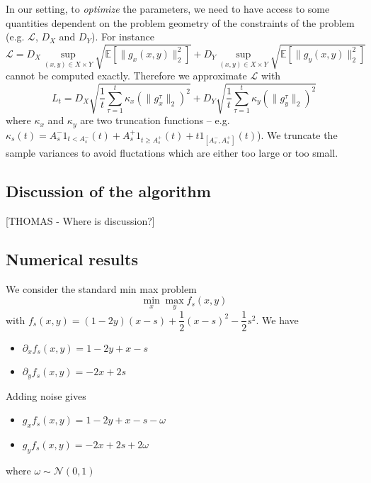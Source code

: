 \documentclass[12pt,reqno]{amsart}
\numberwithin{equation}{section}
\begin{document}
In our setting, to \emph{optimize} the parameters, we need to have access to some quantities dependent on the problem geometry of the constraints of the problem (e.g. $\mathcal{L}$, $D_{X}$ and $D_{Y}$). For instance
$$
\mathcal{L} = D_{X} \sup_{(x,y) \in X \times Y} \sqrt{\mathbb{E}[\lVert g_{x}(x,y) \rVert_{2}^{2}]} + 
D_{Y} \sup_{(x,y) \in X \times Y} \sqrt{\mathbb{E}[\lVert g_{y}(x,y) \rVert_{2}^{2}]}
$$
cannot be computed exactly. Therefore we approximate $\mathcal{L}$ with  
$$
L_{t} = D_{X}\sqrt{\dfrac{1}{t}\sum_{\tau=1}^{t}\kappa_{x}(\lVert g_{x}^{\tau} \rVert_{2})^{2}} + D_{Y}\sqrt{\dfrac{1}{t}\sum_{\tau=1}^{t}  \kappa_{y}(\lVert g_{y}^{\tau} \rVert_{2})^{2}}
$$
where $\kappa_{x}$ and $\kappa_{y}$ are two truncation functions -- e.g. $\kappa_{s}(t) = A_{s}^{-}1_{ t < A_{s}^{-}}(t) + A_{s}^{+}1_{ t \geq A_{s}^{+}}(t) + t 1_{ [A_{s}^{-}, A_{s}^{+}]}(t)$). We truncate the sample variances to avoid fluctations which are either too large or too small.
%
%

\subsection{Discussion of the algorithm}

[THOMAS - Where is discussion?]

\subsection{Numerical results}
We consider the standard min max problem
$$
\min_{x}\max_{y} f_{s}(x,y)
$$
with $f_{s}(x,y) = (1 - 2y)(x - s) + \dfrac{1}{2}(x - s)^{2} - \dfrac{1}{2}s^{2} $. We have 
\begin{itemize}
\item $\partial_{x} f_{s}(x,y) = 1 - 2y + x - s$
\item $\partial_{y} f_{s}(x,y) = -2x + 2s$
\end{itemize}
Adding noise gives
\begin{itemize}
\item $g_{x} f_{s}(x,y) = 1 - 2y + x - s - \omega$
\item $g_{y} f_{s}(x,y) = -2x + 2s + 2\omega$
\end{itemize}
where $\omega \sim \mathcal{N}(0,1)$
\end{document}
